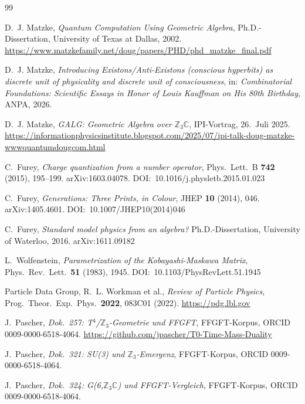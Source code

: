 \begin{thebibliography}{99}

D.~J. Matzke,
\textit{Quantum Computation Using Geometric Algebra},
Ph.D.-Dissertation, University of Texas at Dallas, 2002.
\url{https://www.matzkefamily.net/doug/papers/PHD/phd_matzke_final.pdf}

D.~J. Matzke,
\textit{Introducing Existons/Anti-Existons (conscious hyperbits) as discrete unit of physicality and discrete unit of consciousness},
in: \textit{Combinatorial Foundations: Scientific Essays in Honor of Louis Kauffman on His 80th Birthday},
ANPA, 2026.

D.~J. Matzke,
\textit{GALG: Geometric Algebra over $\mathbb{Z}_3\mathbb{C}$},
IPI-Vortrag, 26.~Juli 2025.
\url{https://informationphysicsinstitute.blogspot.com/2025/07/ipi-talk-doug-matzke-wwwquantumdougcom.html}

C.~Furey,
\textit{Charge quantization from a number operator},
Phys.\ Lett.\ B \textbf{742} (2015), 195--199.
arXiv:1603.04078. DOI:~10.1016/j.physletb.2015.01.023

C.~Furey,
\textit{Generations: Three Prints, in Colour},
JHEP \textbf{10} (2014), 046.
arXiv:1405.4601. DOI:~10.1007/JHEP10(2014)046

C.~Furey,
\textit{Standard model physics from an algebra?}
Ph.D.-Dissertation, University of Waterloo, 2016.
arXiv:1611.09182

L.~Wolfenstein,
\textit{Parametrization of the Kobayashi-Maskawa Matrix},
Phys.\ Rev.\ Lett.\ \textbf{51} (1983), 1945.
DOI:~10.1103/PhysRevLett.51.1945

Particle Data Group, R.~L. Workman et al.,
\textit{Review of Particle Physics},
Prog.\ Theor.\ Exp.\ Phys.\ \textbf{2022}, 083C01 (2022).
\url{https://pdg.lbl.gov}

J.~Pascher,
\textit{Dok.~257: T$^4$/$\mathbb{Z}_3$-Geometrie und FFGFT},
FFGFT-Korpus, ORCID 0009-0000-6518-4064.
\url{https://github.com/jpascher/T0-Time-Mass-Duality}

J.~Pascher,
\textit{Dok.~321: SU(3) und $\mathbb{Z}_3$-Emergenz},
FFGFT-Korpus, ORCID 0009-0000-6518-4064.

J.~Pascher,
\textit{Dok.~324: G(6,$\mathbb{Z}_3\mathbb{C}$) und FFGFT-Vergleich},
FFGFT-Korpus, ORCID 0009-0000-6518-4064.

\end{thebibliography}
